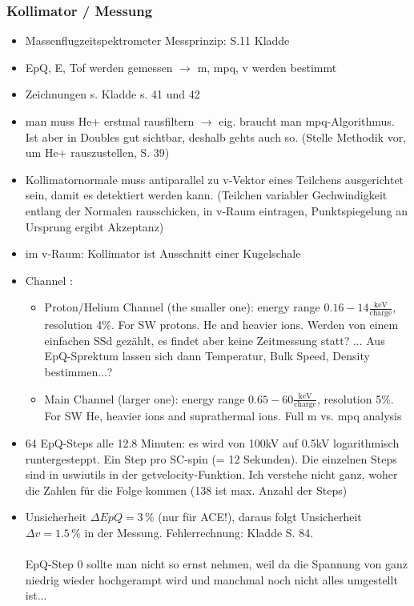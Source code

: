 \documentclass[]{article}
\begin{document}
\subsubsection{Kollimator / Messung}
\begin{itemize}
	\item Massenflugzeitspektrometer Messprinzip: S.11 Kladde
	\item {EpQ, E, Tof} werden gemessen $\rightarrow$ {m, mpq, v} werden bestimmt
	\item Zeichnungen s. Kladde s. 41 und 42
	\item man muss He+ erstmal rausfiltern $\rightarrow$ eig. braucht man mpq-Algorithmus. Ist aber in Doubles gut sichtbar, deshalb gehts auch so. (Stelle Methodik vor, um He+ rauszustellen, S. 39)
	\item Kollimatornormale muss antiparallel zu v-Vektor eines Teilchens ausgerichtet sein, damit es detektiert werden kann. (Teilchen variabler Gechwindigkeit entlang der Normalen rausschicken, in v-Raum eintragen, Punktspiegelung an Ursprung ergibt Akzeptanz)
	\item im v-Raum: Kollimator ist Ausschnitt einer Kugelschale
	\item Channel \citep{gloeckler_1992}:
	\begin{itemize}
		\item Proton/Helium Channel (the smaller one): energy range $0.16 - 14 \frac{\mathrm{keV}}{\mathrm{charge}}$, resolution 4\%. For SW protons. He and heavier ions. Werden von einem einfachen SSd gezählt, es findet aber keine Zeitmessung statt? ... Aus EpQ-Sprektum lassen sich dann Temperatur, Bulk Speed, Density bestimmen...?
		\item Main Channel (larger one): energy range $0.65 - 60 \frac{\mathrm{keV}}{\mathrm{charge}}$, resolution 5\%. For SW He, heavier ions and suprathermal ions. Full m vs. mpq analysis
	\end{itemize}
	\item 64 EpQ-Steps alle 12.8 Minuten: es wird von 100kV auf 0.5kV logarithmisch runtergesteppt. Ein Step pro SC-spin (= 12 Sekunden). Die einzelnen Steps sind in uswiutils in der getvelocity-Funktion. Ich verstehe nicht ganz, woher die Zahlen für die Folge kommen (138 ist max. Anzahl der Steps)
	\item Unsicherheit $\Delta EpQ = 3\,\%$ (nur für ACE!), daraus folgt Unsicherheit $\Delta v = 1.5\,\%$ in der Messung. Fehlerrechnung: Kladde S. 84. \\ \\
	EpQ-Step 0 sollte man nicht so ernst nehmen, weil da die Spannung von ganz niedrig wieder hochgerampt wird und manchmal noch nicht alles umgestellt ist...

\end{itemize}
\end{document}
